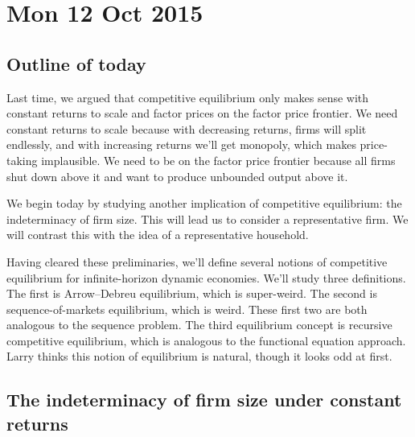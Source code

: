 \documentclass[11pt,letterpaper,reqno,oneside]{article}
\begin{document}
\pagebreak
\section{Mon 12 Oct 2015}
\label{sec:12Oct2015}


\subsection{Outline of today}
\label{sec:12Oct2015:outline_of_today}

Last time, we argued that competitive equilibrium only makes sense with constant returns to scale and factor prices on the factor price frontier. We need constant returns to scale because with decreasing returns, firms will split endlessly, and with increasing returns we'll get monopoly, which makes price-taking implausible. We need to be on the factor price frontier because all firms shut down above it and want to produce unbounded output above it.

We begin today by studying another implication of competitive equilibrium: the indeterminacy of firm size. This will lead us to consider a representative firm. We will contrast this with the idea of a representative household.

Having cleared these preliminaries, we'll define several notions of competitive equilibrium for infinite-horizon dynamic economies. We'll study three definitions. The first is Arrow--Debreu equilibrium, which is super-weird. The second is sequence-of-markets equilibrium, which is weird. These first two are both analogous to the sequence problem. The third equilibrium concept is recursive competitive equilibrium, which is analogous to the functional equation approach. Larry thinks this notion of equilibrium is natural, though it looks odd at first.



\subsection{The indeterminacy of firm size under constant returns}
\label{sec:12Oct2015:indeterminacy_of_firm_size}
\end{document}
